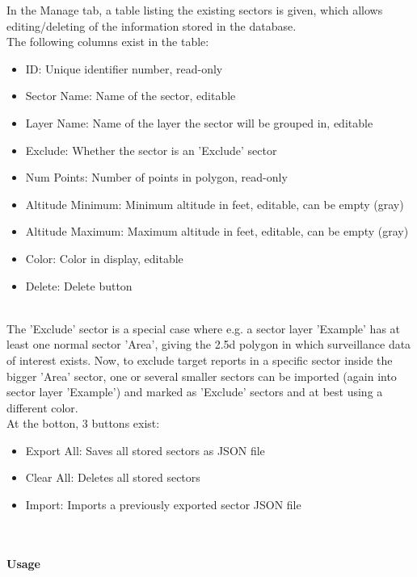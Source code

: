 In the Manage tab, a table listing the existing sectors is given, which allows editing/deleting of the information stored in the database. \\

The following columns exist in the table:
\begin{itemize}
\item ID: Unique identifier number, read-only
\item Sector Name: Name of the sector, editable
\item Layer Name: Name of the layer the sector will be grouped in, editable
\item Exclude: Whether the sector is an 'Exclude' sector
\item Num Points: Number of points in polygon, read-only
\item Altitude Minimum: Minimum altitude in feet, editable, can be empty (gray)
\item Altitude Maximum: Maximum altitude in feet, editable, can be empty (gray)
\item Color: Color in display, editable
\item Delete: Delete button
\end{itemize}
\ \\

The 'Exclude' sector is a special case where e.g. a sector layer 'Example' has at least one normal sector 'Area', giving the 2.5d polygon in which surveillance data of interest exists. Now, to exclude target reports in a specific sector inside the bigger 'Area' sector, one or several smaller sectors can be imported (again into sector layer 'Example') and marked as 'Exclude' sectors and at best using a different color. \\

At the botton, 3 buttons exist:

\begin{itemize}
\item Export All: Saves all stored sectors as JSON file
\item Clear All: Deletes all stored sectors
\item Import: Imports a previously exported sector JSON file
\end{itemize}
\ \\

\paragraph {Usage}

